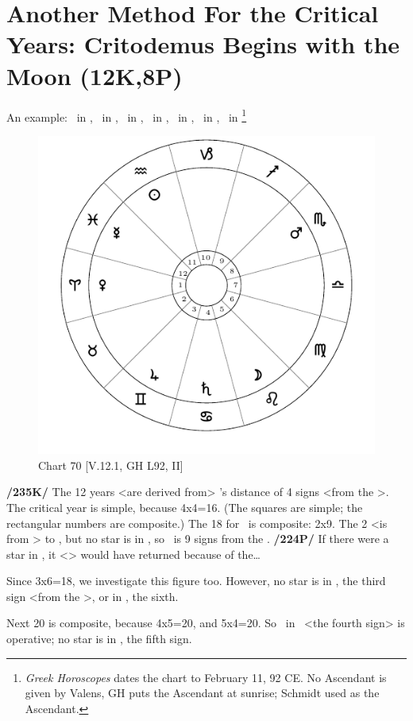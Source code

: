 \section{Another Method For the Critical Years: Critodemus Begins with the Moon (12K,8P)}

An example: \Sun\, in \Aquarius, \Moon\, in \Leo, \Saturn\, in \Cancer, \Jupiter\, in \Gemini, \Mars\, in \Scorpio, \Venus\, in \Aries, \Mercury\, in \Pisces\footnote{\textit{Greek Horoscopes} dates the chart to February 11, 92 CE. No Ascendant is given by Valens, GH puts the Ascendant at sunrise; Schmidt used \Aries as the Ascendant.} 

\begin{figure}
\centering
\vspace{-20pt}
\includegraphics[width=.68\textwidth]{charts/5_12_1}
\caption{Chart 70 [V.12.1, GH L92, II]}
\label{fig:chart70}
\end{figure}

\noindent\textbf{/235K/} The 12 years <are derived from> \Mars’s distance of 4 signs <from the \Moon>. The critical year is simple, because 4x4=16. (The squares are simple; the rectangular numbers are composite.) The 18 for \Venus\, is composite: 2x9. The 2 <is from \Leo> to \Virgo, but no star is in \Virgo, so \Venus\, is 9 signs from the \Moon. \textbf{/224P/} If there were a star in \Virgo, it <\Venus> would have returned because of the…

Since 3x6=18, we investigate this figure too. However, no star is in \Libra, the third sign <from the \Moon>, or in \Capricorn, the sixth.

Next 20 is composite, because 4x5=20, and 5x4=20. So \Mars\, in \Scorpio\, <the fourth sign> is operative; no star is in \Sagittarius, the fifth sign.

